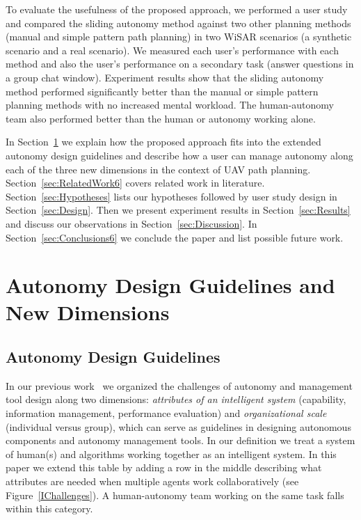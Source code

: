 \documentclass[lettersize, apacite, twoside, HRI]{apa_HRI}
\begin{document}
To evaluate the usefulness of the proposed approach, we performed a user study and compared the sliding autonomy method against two other planning methods (manual and simple pattern path planning) in two WiSAR scenarios (a synthetic scenario and a real scenario). We measured each user's performance with each method and also the user's performance on a secondary task (answer questions in a group chat window). Experiment results show that the sliding autonomy method performed significantly better than the manual or simple pattern planning methods with no increased mental workload. The human-autonomy team also performed better than the human or autonomy working alone.

In Section~\ref{sec:dimensions} we explain how the proposed approach fits into the extended autonomy design guidelines and describe how a user can manage autonomy along each of the three new dimensions in the context of UAV path planning. Section~\ref{sec:RelatedWork6} covers related work in literature. Section~\ref{sec:Hypotheses} lists our hypotheses followed by user study design in Section~\ref{sec:Design}. Then we present experiment results in Section~\ref{sec:Results} and discuss our observations in Section~\ref{sec:Discussion}. In Section~\ref{sec:Conclusions6} we conclude the paper and list possible future work.

\section{Autonomy Design Guidelines and New Dimensions}
\label{sec:dimensions}

\subsection{Autonomy Design Guidelines}

In our previous work~\cite{Lin2010Supporting} we organized the challenges of autonomy and management tool design along two dimensions: \textit{attributes of an intelligent system} (capability, information management, performance evaluation) and \textit{organizational scale} (individual versus group), which can serve as guidelines in designing autonomous components and autonomy management tools. In our definition we treat a system of human(s) and algorithms working together as an intelligent system. In this paper we extend this table by adding a row in the middle describing what attributes are needed when multiple agents work collaboratively (see Figure~\ref{IChallenges}). A human-autonomy team working on the same task falls within this category. 
\end{document}
